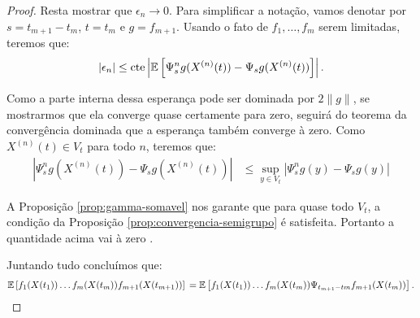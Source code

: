 \begin{proof}
  Resta mostrar que $\epsilon_n \to 0$. Para simplificar a notação,
  vamos denotar por $s = t_{m+1} - t_m$, $t = t_m$ e $g = f_{m+1}$.
  Usando o fato de $f_1, \ldots, f_m$ serem limitadas, teremos que:
  \begin{displaymath}
    |\epsilon_n| \leq  \textrm{cte}
    \left\lvert {\mathbb{E}} \left[
        \Psi_{s}^n g (X^{(n)}(t)) -
        \Psi_{s} g (X^{(n)}(t))
      \right]
    \right\rvert.
  \end{displaymath}

  Como a parte interna dessa esperança pode ser dominada por $2\lVert
  g \rVert$, se mostrarmos que ela converge quase certamente para
  zero, seguirá do teorema da convergência dominada que a esperança também
  converge à zero. Como $X^{(n)}(t) \in V_t$ para todo $n$, teremos
  que:
  \begin{align*}
    \left\lvert \Psi_{s}^n g (X^{(n)}(t)) - \Psi_{s} g (X^{(n)}(t))
    \right\rvert
    &\leq \sup_{y \in V_t}  \left\lvert \Psi_{s}^n g (y) - \Psi_{s} g (y)
    \right\rvert
  \end{align*}

  A Proposição \ref{prop:gamma-somavel} nos garante que para quase
  todo $V_t$, a condição da Proposição
  \ref{prop:convergencia-semigrupo} é satisfeita. Portanto a
  quantidade acima vai à zero \qc.

  Juntando tudo concluímos que:
  \begin{displaymath}
    {\mathbb{E}} \left[
      f_{1}(X(t_{1})) 
      \ldots
      f_{m}(X(t_{m})) 
      f_{m+1}(X(t_{m+1})) 
    \right] \notag\\
    = {\mathbb{E}} \left[
      f_{1}(X(t_{1})) 
      \ldots
      f_{m}(X(t_{m})) 
      \Psi_{t_{m+1} - t{m}} f_{m+1} (X(t_{m})) 
    \right].
  \end{displaymath}
\end{proof}



